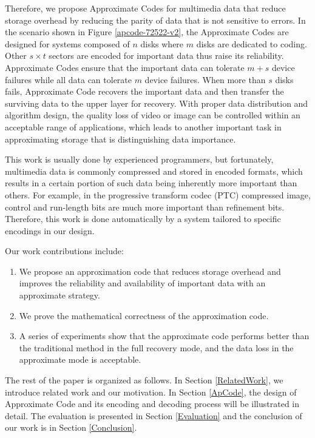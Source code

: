 \documentclass[sigconf]{acmart}
\begin{document}
Therefore, we propose Approximate Codes for multimedia data that reduce storage overhead by reducing the parity of data that is not sensitive to errors. In the scenario shown in Figure \ref{apcode-72522-v2}, the Approximate Codes are designed for systems composed of $n$ disks where $m$ disks are dedicated to coding.
Other $s \times t$ sectors are encoded for important data thus raise its reliability. Approximate Codes ensure that the important data can tolerate $m+s$ device failures while all data can tolerate $m$ device failures.
When more than $s$ disks fails, Approximate Code recovers the important data and then transfer the surviving data to the upper layer for recovery. With proper data distribution and algorithm design, the quality loss of video or image can be controlled within an acceptable range of applications, which leads to another important task in approximating storage that is distinguishing data importance.

This work is usually done by experienced programmers, but fortunately, multimedia data is commonly compressed and stored in encoded formats, which results in a certain portion of such data being inherently more important than others. For example, in the progressive transform codec (PTC) compressed image, control and run-length bits are much more important than refinement bits. Therefore, this work is done automatically by a system tailored to specific encodings in our design.

Our work contributions include:
\begin{enumerate}
\item We propose an approximation code that reduces storage overhead and improves the reliability and availability of important data with an approximate strategy.
\item We prove the mathematical correctness of the approximation code.
\item A series of experiments show that the approximate code performs better than the traditional method in the full recovery mode, and the data loss in the approximate mode is acceptable.
\end{enumerate}

The rest of the paper is organized as follows. In Section \ref{RelatedWork}, we introduce related work and our motivation. In Section \ref{ApCode}, the design of Approximate Code and its encoding and decoding process will be illustrated in detail. The evaluation is presented in Section \ref{Evaluation} and the conclusion of our work is in Section \ref{Conclusion}. 
\end{document}

